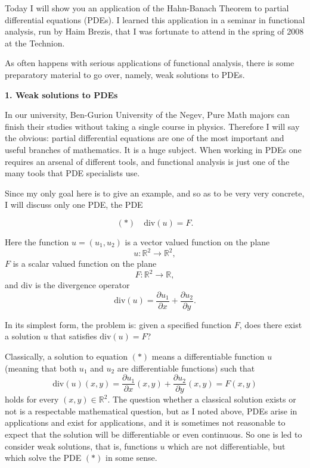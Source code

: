 \documentclass[12pt]{article}
\begin{document}
Today I will show you an application of the Hahn-Banach Theorem to partial differential equations (PDEs). I learned this application in a seminar in functional analysis, run by Haim Brezis, that I was fortunate to attend in the spring of 2008 at the Technion.

As often happens with serious applications of functional analysis, there is some preparatory material to go over, namely, weak solutions to PDEs.

\bigskip

\noindent
\textbf{1. Weak solutions to PDEs}

In our university, Ben-Gurion University of the Negev, Pure Math majors can finish their studies without taking a single course in physics. Therefore I will say the obvious: partial differential equations are one of the most important and useful branches of mathematics. It is a huge subject. When working in PDEs one requires an arsenal of different tools, and functional analysis is just one of the many tools that PDE specialists use.

Since my only goal here is to give an example, and so as to be very very concrete, I will discuss only one PDE, the PDE

\[
(*) \quad \mathrm{div}(u) = F.
\]

Here the function \(u = (u_1, u_2)\) is a vector valued function on the plane 
\[
u: \mathbb{R}^2 \to \mathbb{R}^2,
\]
\(F\) is a scalar valued function on the plane
\[
F: \mathbb{R}^2 \to \mathbb{R},
\]
and \(\mathrm{div}\) is the divergence operator
\[
\mathrm{div}(u) 
= \frac{\partial u_1}{\partial x} + \frac{\partial u_2}{\partial y}.
\]

In its simplest form, the problem is: given a specified function \(F\), does there exist a solution \(u\) that satisfies \(\mathrm{div}(u) = F\)?

Classically, a solution to equation \((*)\) means a differentiable function \(u\) (meaning that both \(u_1\) and \(u_2\) are differentiable functions) such that
\[
\mathrm{div}(u)(x,y) 
= \frac{\partial u_1}{\partial x}(x,y) + \frac{\partial u_2}{\partial y}(x,y) 
= F(x,y)
\]
holds for every \((x,y)\in \mathbb{R}^2\). The question whether a classical solution exists or not is a respectable mathematical question, but as I noted above, PDEs arise in applications and exist for applications, and it is sometimes not reasonable to expect that the solution will be differentiable or even continuous. So one is led to consider weak solutions, that is, functions \(u\) which are not differentiable, but which solve the PDE \((*)\) in some sense.
\end{document}
